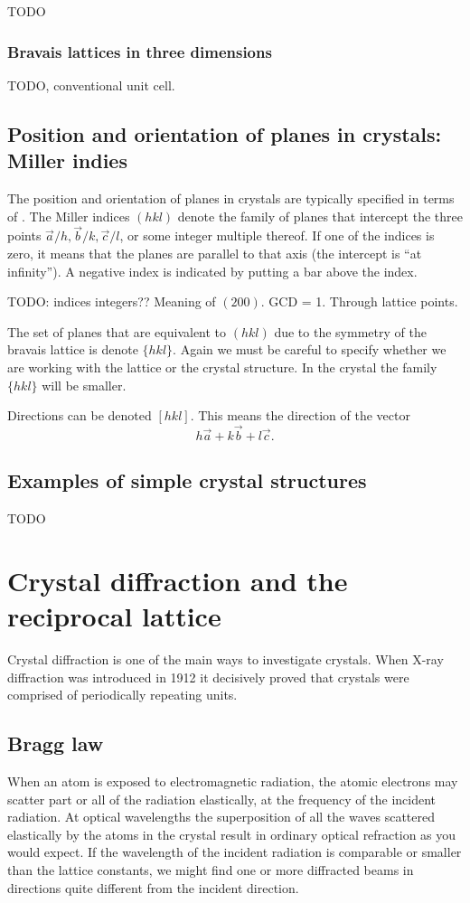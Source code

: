 TODO

\subsection{Bravais lattices in three dimensions}
TODO, conventional unit cell.


\section{Position and orientation of planes in crystals: Miller indies}
The position and orientation of planes in crystals are typically specified in terms of . The Miller indices $(hkl)$ denote the family of planes that intercept the three points $\vec{a}/h, \vec{b}/k, \vec{c}/l$, or some integer multiple thereof. If one of the indices is zero, it means that the planes are parallel to that axis (the intercept is ``at infinity''). A negative index is indicated by putting a bar above the index.

TODO: indices integers?? Meaning of $(200)$. GCD = 1. Through lattice points.

The set of planes that are equivalent to $(hkl)$ due to the symmetry of the bravais lattice is denote $\{hkl\}$. Again we must be careful to specify whether we are working with the lattice or the crystal structure. In the crystal the family $\{hkl\}$ will be smaller.

Directions can be denoted $[hkl]$. This means the direction of the vector
\[ h \vec{a} + k \vec{b} + l \vec{c}. \]

\section{Examples of simple crystal structures}
TODO

\chapter{Crystal diffraction and the reciprocal lattice}
Crystal diffraction is one of the main ways to investigate crystals. When X-ray diffraction was introduced in 1912 it decisively proved that crystals were comprised of periodically repeating units.
\section{Bragg law}
When an atom is exposed to electromagnetic radiation, the atomic electrons may scatter part or all of the radiation elastically, at the frequency of the incident radiation. At optical wavelengths the superposition of all the waves scattered elastically by the atoms in the crystal result in ordinary optical refraction as you would expect. If the wavelength of the incident radiation is comparable or smaller than the lattice constants, we might find one or more diffracted beams in directions quite different from the incident direction.

